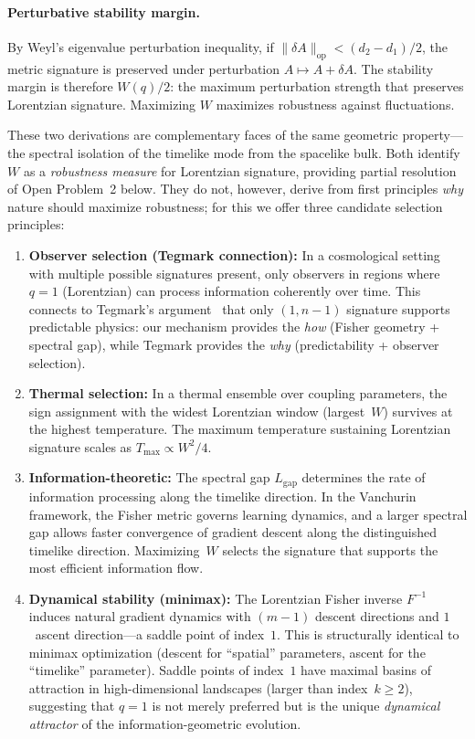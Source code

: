 \documentclass[11pt]{article}
\theoremstyle{definition}
\theoremstyle{remark}
\begin{document}
\paragraph{Perturbative stability margin.}
By Weyl's eigenvalue perturbation inequality, if $\|\delta A\|_{\mathrm{op}}
< (d_2 - d_1)/2$, the metric signature is preserved under perturbation
$A \mapsto A + \delta A$. The stability margin is therefore $W(q)/2$: the
maximum perturbation strength that preserves Lorentzian signature. Maximizing
$W$ maximizes robustness against fluctuations.

These two derivations are complementary faces of the same geometric
property---the spectral isolation of the timelike mode from the spacelike
bulk. Both identify $W$ as a \emph{robustness measure} for Lorentzian
signature, providing partial resolution of Open Problem~2 below. They do
not, however, derive from first principles \emph{why} nature should maximize
robustness; for this we offer three candidate selection principles:

\begin{enumerate}
\item \textbf{Observer selection (Tegmark connection):} In a cosmological
  setting with multiple possible signatures present, only observers in
  regions where $q=1$ (Lorentzian) can process information coherently over
  time. This connects to Tegmark's argument~\cite{Tegmark1997} that only
  $(1,n{-}1)$ signature supports predictable physics: our mechanism provides
  the \emph{how} (Fisher geometry + spectral gap), while Tegmark provides the
  \emph{why} (predictability + observer selection).

\item \textbf{Thermal selection:} In a thermal ensemble over coupling
  parameters, the sign assignment with the widest Lorentzian window
  (largest~$W$) survives at the highest temperature. The maximum temperature
  sustaining Lorentzian signature scales as $T_{\max} \propto W^2/4$.

\item \textbf{Information-theoretic:} The spectral gap $L_{\mathrm{gap}}$
  determines the rate of information processing along the timelike direction.
  In the Vanchurin framework, the Fisher metric governs learning dynamics, and
  a larger spectral gap allows faster convergence of gradient descent along the
  distinguished timelike direction. Maximizing~$W$ selects the signature that
  supports the most efficient information flow.

\item \textbf{Dynamical stability (minimax):} The Lorentzian Fisher inverse
  $F^{-1}$ induces natural gradient dynamics with $(m{-}1)$ descent directions
  and $1$~ascent direction---a saddle point of index~$1$. This is structurally
  identical to minimax optimization (descent for ``spatial'' parameters,
  ascent for the ``timelike'' parameter). Saddle points of index~$1$ have
  maximal basins of attraction in high-dimensional landscapes (larger than
  index~$k \geq 2$), suggesting that $q = 1$ is not merely preferred but is
  the unique \emph{dynamical attractor} of the information-geometric evolution.
\end{enumerate}
\end{document}
